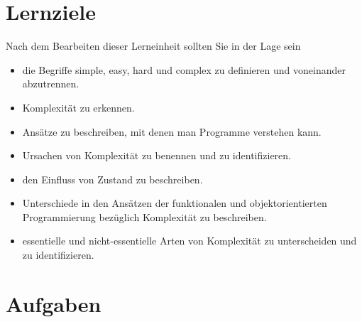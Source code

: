\documentclass[11pt,a4paper]{article}
\theoremstyle{break}
\begin{document}
\section{Lernziele}

Nach dem Bearbeiten dieser Lerneinheit sollten Sie in der Lage sein

\begin{itemize}
    \item die Begriffe simple, easy, hard und complex zu definieren und voneinander abzutrennen.
    \item Komplexit\"at zu erkennen.
    \item Ans\"atze zu beschreiben, mit denen man Programme verstehen kann.
    \item Ursachen von Komplexit\"at zu benennen und zu identifizieren.
    \item den Einfluss von Zustand zu beschreiben.
    \item Unterschiede in den Ans\"atzen der funktionalen und objektorientierten Programmierung bez\"uglich Komplexit\"at zu beschreiben.
    \item essentielle und nicht-essentielle Arten von Komplexit\"at zu unterscheiden und zu identifizieren.
\end{itemize}



\section{Aufgaben}
\end{document}

